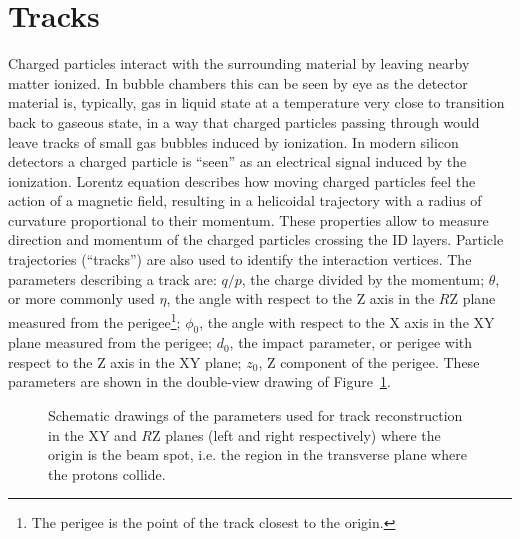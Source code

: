 
\section{Tracks}\label{sec:tracks}

Charged particles interact with the surrounding material by
leaving nearby matter ionized. In bubble chambers this can be
seen by eye as the detector material is, typically, gas in liquid
state at a temperature very close to transition back to gaseous state,
in a way that charged particles passing through would leave tracks of
small gas bubbles induced by ionization. In modern silicon detectors
a charged particle is ``seen'' as an electrical signal induced by the
ionization. Lorentz equation describes how moving charged particles
feel the action of a magnetic field, resulting in a helicoidal trajectory with a
radius of curvature proportional to their momentum. These properties allow
to measure direction and momentum of the charged particles crossing
the ID layers. Particle trajectories (``tracks'') are 
also used to identify the interaction vertices.
The parameters describing a track are: $q/p$, the charge divided by the momentum; $\theta$, or more commonly used $\eta$, the angle
with respect to the Z axis in the $R$Z plane measured from the 
perigee\footnote{The perigee is the point of the track closest to the origin.}; $\phi_0$, the angle 
with respect to the X axis in the XY plane measured from the perigee; $d_0$, the impact parameter, 
or perigee with respect to the Z axis in the XY plane; $z_0$, Z component of the perigee.
These parameters are shown in the double-view drawing of Figure~\ref{fig:trackpar}.

\begin{figure}[tb]\begin{center}
	\caption[bla]{Schematic drawings of the parameters used for track 
        reconstruction in the XY and $R$Z planes (left and right respectively)
          where the origin is the beam spot, i.e. the region in the transverse plane where the protons collide.
\label{fig:trackpar}}
\end{center}\end{figure}

